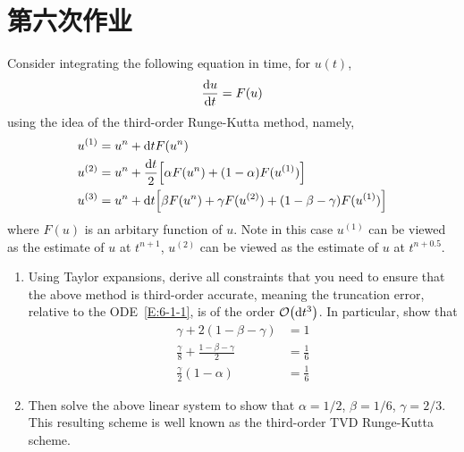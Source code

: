 \section{第六次作业}

\begin{homework}[label={H:6-1}]
    Consider integrating the following equation in time, for $u(t)$,
    \begin{equation}\label{E:6-1-1}
        \dv{u}{t} = F(u)
    \end{equation}
    using the idea of the third-order Runge-Kutta method, namely,
    \begin{equation*}
        \begin{aligned}
            u^{(1)} &= u^n + \dd t F(u^n) \\
            u^{(2)} &= u^n + \frac{\dd t}{2} \qty[\alpha F(u^n)+(1-\alpha)F(u^{(1)})] \\
            u^{(3)} &= u^n + \dd t \qty[\beta F(u^n)+\gamma F(u^{(2)})+(1-\beta-\gamma)F(u^{(1)})]
        \end{aligned}
    \end{equation*}
    where $F(u)$ is an arbitary function of $u$. Note in this case $u^{(1)}$ can be viewed as the estimate of $u$ at $t^{n+1}$, $u^{(2)}$ can be viewed as the estimate of $u$ at $t^{n+0.5}$.

    \begin{enumerate}[label=(\alph*)]
        \item Using Taylor expansions, derive all constraints that you need to ensure that the above method is third-order accurate, meaning the truncation error, relative to the ODE~\eqref{E:6-1-1}, is of the order $\order{\dd t^3}$. In particular, show that
            \begin{equation*}
                \begin{aligned}
                    \gamma+2(1-\beta-\gamma) &= 1 \\
                    \frac{\gamma}{8}+\frac{1-\beta-\gamma}{2} &= \frac{1}{6} \\
                    \frac{\gamma}{2}(1-\alpha) &= \frac{1}{6}
                \end{aligned}
            \end{equation*}
        \item Then solve the above linear system to show that $\alpha=1/2$, $\beta=1/6$, $\gamma=2/3$. This resulting scheme is well known as the third-order TVD Runge-Kutta scheme.
    \end{enumerate}
\end{homework}


